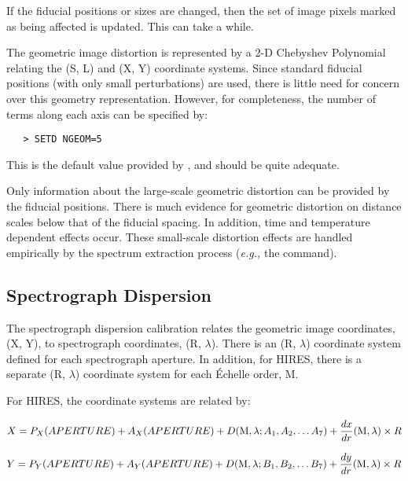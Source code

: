 If the fiducial positions or sizes are changed, then the set of image pixels
marked as being affected is updated. This can take a while.

The geometric image distortion is represented by a 2-D Chebyshev Polynomial
relating the (S, L) and (X, Y) coordinate systems.  Since standard fiducial
positions (with only small 
 perturbations) are used, there is
little need for concern over this geometry representation.  However, for
completeness, the number of terms along each axis can be specified by:

\begin{verbatim}
   > SETD NGEOM=5
\end{verbatim}

This is the default value provided by , 
and should be quite adequate.

Only information about the large-scale geometric distortion can be provided
by the fiducial positions.  There is much evidence for geometric distortion
on distance scales below that of the fiducial spacing.  In addition, time
and temperature dependent effects occur.  These small-scale distortion effects
are handled empirically by the spectrum extraction process ({\it{e.g.,}} the
 command)\@.


\subsection{Spectrograph Dispersion}

The spectrograph dispersion calibration relates the geometric image
coordinates, (X, Y), to spectrograph coordinates, (R, $\lambda$)\@.  There is
an (R, $\lambda$) coordinate system defined for each spectrograph aperture.  In
addition, for HIRES, there is a separate (R, $\lambda$) coordinate system for
each \'{E}chelle order, M\@.

For HIRES, the coordinate systems are related by:

\begin{displaymath}
X =
P_{X}(APERTURE) +
A_{X}(APERTURE) +
D({\rm M}, \lambda ; A_{1}, A_{2},\ldots A_{7}) +
\frac{dx}{dr}({\rm M}, \lambda) \times R
\end{displaymath}

\begin{displaymath}
Y =
P_{Y}(APERTURE) +
A_{Y}(APERTURE) +
D({\rm M}, \lambda ; B_{1}, B_{2},\dots B_{7}) +
\frac{dy}{dr}({\rm M}, \lambda) \times R
\end{displaymath}

